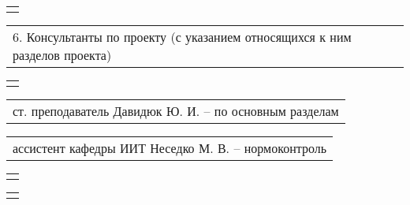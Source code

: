 \documentclass[12pt, А4, twoside]{article}
\begin{document}
\begin{FlushLeft}
    \begin{tabular}{p{17.25cm}}
        \vspace{0pt} \hline  \\
    \end{tabular}

    \vspace{-0.1 cm}

    \begin{tabular}{p{17.25cm}}
        \textsf{6. Консультанты по проекту (с указанием относящихся к ним разделов проекта)} \vspace{0pt} \hline \\
    \end{tabular}

    \begin{tabular}{p{17.25cm}}
        \vspace{0pt} \hline \\
    \end{tabular}

    \vspace{-0.1 cm}

    \begin{tabular}{p{17.25cm}}
        \hspace{0.3cm} \textsf{ст. преподаватель Давидюк Ю. И.} \hspace{4.065cm} \textsf{{--} по основным разделам} \vspace{0pt} \hline \\
    \end{tabular}

    \vspace{-0.1 cm}

    \begin{tabular}{p{17.25cm}}
        \hspace{0.3cm} \textsf{ассистент кафедры ИИТ Неседко М. В.} \hspace{3.3325cm} \textsf{{--} нормоконтроль} \vspace{0pt} \hline \\
    \end{tabular}

    \vspace{-0.1 cm}

    \begin{tabular}{p{17.25cm}}
        \vspace{0pt} \hline \\
    \end{tabular}

    \begin{tabular}{p{17.25cm}}
        \vspace{0pt} \hline \\
    \end{tabular}


\end{FlushLeft}
\end{document}
